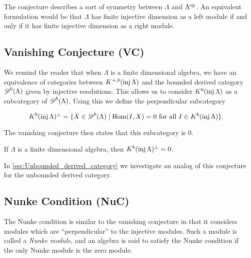 The conjecture describes a sort of symmetry between $\Lambda$ and $\Lambda^{\operatorname{op}}$. An equivalent formulation would be that $\Lambda$ has finite injective dimension as a left module if and only if it has finite injective dimension as a right module.


\subsection*{Vanishing Conjecture (VC)}

We remind the reader that when $\Lambda$ is a finite dimensional algebra, we have an equivalence of categories between $K^{+,b}(\operatorname{inj}\Lambda)$ and the bounded derived category $\operatorname{\mathscr{D}}^b(\Lambda)$ given by injective resolutions. This allows us to consider $K^b(\operatorname{inj}\Lambda)$ as a subcategory of $\operatorname{\mathscr{D}}^b(\Lambda)$. Using this we define the perpendicular subcategory

$$K^b(\operatorname{inj}\Lambda)^\perp = \{X \in \operatorname{\mathscr{D}}^b(\Lambda) \mid \operatorname{Hom}(I, X)=0 \text{ for all } I \in K^b(\operatorname{inj}\Lambda)\}.$$

The vanishing conjecture then states that this subcategory is 0.
\begin{conj} 
	If $\Lambda$ is a finite dimensional algebra, then $K^b(\operatorname{inj}\Lambda)^\perp = 0$.
\end{conj}

In \cref{sec:Unbounded_derived_category} we investigate an analog of this conjecture for the unbounded derived category.

\subsection*{Nunke Condition (NuC)}
The Nunke condition is similar to the vanishing conjecture in that it considers modules which are ``perpendicular'' to the injective modules. Such a module is called a \emph{Nunke module}, and an algebra is said to satisfy the Nunke condition if the only Nunke module is the zero module.

